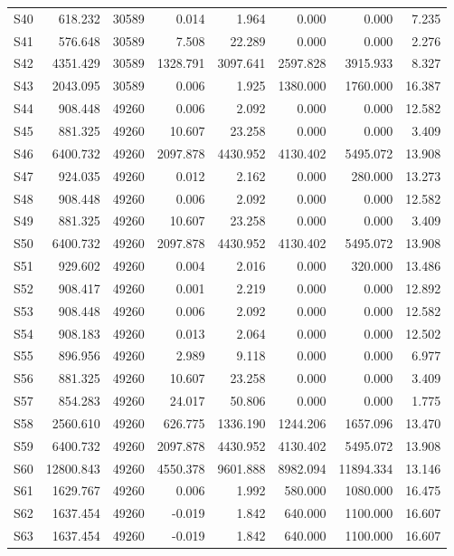 \begin{longtable}{lrrrrrrr}
S40 & 618.232 & 30589 & 0.014 & 1.964 & 0.000 & 0.000 & 7.235\\
S41 & 576.648 & 30589 & 7.508 & 22.289 & 0.000 & 0.000 & 2.276\\
S42 & 4351.429 & 30589 & 1328.791 & 3097.641 & 2597.828 & 3915.933 & 8.327\\
S43 & 2043.095 & 30589 & 0.006 & 1.925 & 1380.000 & 1760.000 & 16.387\\
S44 & 908.448 & 49260 & 0.006 & 2.092 & 0.000 & 0.000 & 12.582\\
S45 & 881.325 & 49260 & 10.607 & 23.258 & 0.000 & 0.000 & 3.409\\
S46 & 6400.732 & 49260 & 2097.878 & 4430.952 & 4130.402 & 5495.072 & 13.908\\
S47 & 924.035 & 49260 & 0.012 & 2.162 & 0.000 & 280.000 & 13.273\\
S48 & 908.448 & 49260 & 0.006 & 2.092 & 0.000 & 0.000 & 12.582\\
S49 & 881.325 & 49260 & 10.607 & 23.258 & 0.000 & 0.000 & 3.409\\
S50 & 6400.732 & 49260 & 2097.878 & 4430.952 & 4130.402 & 5495.072 & 13.908\\
S51 & 929.602 & 49260 & 0.004 & 2.016 & 0.000 & 320.000 & 13.486\\
S52 & 908.417 & 49260 & 0.001 & 2.219 & 0.000 & 0.000 & 12.892\\
S53 & 908.448 & 49260 & 0.006 & 2.092 & 0.000 & 0.000 & 12.582\\
S54 & 908.183 & 49260 & 0.013 & 2.064 & 0.000 & 0.000 & 12.502\\
S55 & 896.956 & 49260 & 2.989 & 9.118 & 0.000 & 0.000 & 6.977\\
S56 & 881.325 & 49260 & 10.607 & 23.258 & 0.000 & 0.000 & 3.409\\
S57 & 854.283 & 49260 & 24.017 & 50.806 & 0.000 & 0.000 & 1.775\\
S58 & 2560.610 & 49260 & 626.775 & 1336.190 & 1244.206 & 1657.096 & 13.470\\
S59 & 6400.732 & 49260 & 2097.878 & 4430.952 & 4130.402 & 5495.072 & 13.908\\
S60 & 12800.843 & 49260 & 4550.378 & 9601.888 & 8982.094 & 11894.334 & 13.146\\
S61 & 1629.767 & 49260 & 0.006 & 1.992 & 580.000 & 1080.000 & 16.475\\
S62 & 1637.454 & 49260 & -0.019 & 1.842 & 640.000 & 1100.000 & 16.607\\
S63 & 1637.454 & 49260 & -0.019 & 1.842 & 640.000 & 1100.000 & 16.607\\

\end{longtable}
